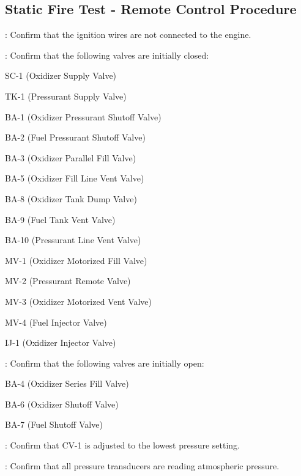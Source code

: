 \newpage

\subsection{Static Fire Test - Remote Control Procedure}
\begin{checklist}
    \item \secondary{}: Confirm that the ignition wires are not connected to the engine.
    \item \primary{}: Confirm that the following valves are initially closed:
    \begin{checklist}
        \item SC-1 (Oxidizer Supply Valve)
        \item TK-1 (Pressurant Supply Valve)
        \item BA-1 (Oxidizer Pressurant Shutoff Valve)
        \item BA-2 (Fuel Pressurant Shutoff Valve)
        \item BA-3 (Oxidizer Parallel Fill Valve)
        \item BA-5 (Oxidizer Fill Line Vent Valve)
        \item BA-8 (Oxidizer Tank Dump Valve)
        \item BA-9 (Fuel Tank Vent Valve)
        \item BA-10 (Pressurant Line Vent Valve)
        \item MV-1 (Oxidizer Motorized Fill Valve)
        \item MV-2 (Pressurant Remote Valve)
        \item MV-3 (Oxidizer Motorized Vent Valve)
        \item MV-4 (Fuel Injector Valve)
        \item IJ-1 (Oxidizer Injector Valve)
    \end{checklist}
    \item \primary{}: Confirm that the following valves are initially open:
    \begin{checklist}
        \item BA-4 (Oxidizer Series Fill Valve)
        \item BA-6 (Oxidizer Shutoff Valve)
        \item BA-7 (Fuel Shutoff Valve)
    \end{checklist}
    \item \primary{}: Confirm that CV-1 is adjusted to the lowest pressure setting.
    \item \daq{}: Confirm that all pressure transducers are reading atmospheric pressure.

\end{checklist}
